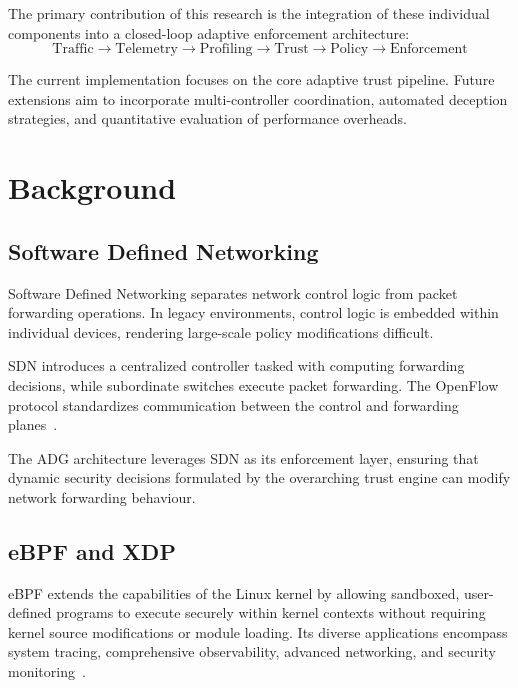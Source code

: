 \documentclass[conference]{IEEEtran}
\begin{document}
The primary contribution of this research is the integration of these individual components into a closed-loop adaptive enforcement architecture:
\begin{equation}
\text{Traffic} \rightarrow \text{Telemetry} \rightarrow \text{Profiling} \rightarrow \text{Trust} \rightarrow \text{Policy} \rightarrow \text{Enforcement}
\end{equation}

The current implementation focuses on the core adaptive trust pipeline. Future extensions aim to incorporate multi-controller coordination, automated deception strategies, and quantitative evaluation of performance overheads.


\section{Background}

\subsection{Software Defined Networking}
Software Defined Networking separates network control logic from packet forwarding operations. In legacy environments, control logic is embedded within individual devices, rendering large-scale policy modifications difficult. 

SDN introduces a centralized controller tasked with computing forwarding decisions, while subordinate switches execute packet forwarding. The OpenFlow protocol standardizes communication between the control and forwarding planes~\cite{mckeown2008openflow}. 

The ADG architecture leverages SDN as its enforcement layer, ensuring that dynamic security decisions formulated by the overarching trust engine can modify network forwarding behaviour.

\subsection{eBPF and XDP}
eBPF extends the capabilities of the Linux kernel by allowing sandboxed, user-defined programs to execute securely within kernel contexts without requiring kernel source modifications or module loading. Its diverse applications encompass system tracing, comprehensive observability, advanced networking, and security monitoring~\cite{ebpf}.
\end{document}
